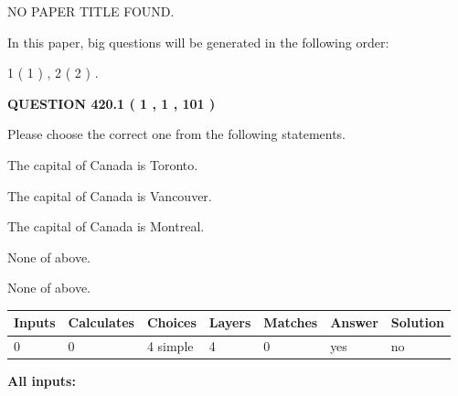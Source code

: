 \documentclass[12pt]{article}
\begin{document}
   
   
   
 NO PAPER TITLE FOUND.
   
   
   
\vspace{0.2in}
   
In this paper, big questions will be generated in the following order: 
   
   
   1 ( 1 )
 ,
   2 ( 2 )
 .
  
\vspace{0.2in}
  
{\textbf{\Large{QUESTION
420.1 
 ( 1 , 1 , 101 )
}}}
  
  
Please choose the correct one from the following statements.
 
 
The capital of Canada is Toronto.
 
 
The capital of Canada is Vancouver.
 
 
The capital of Canada is Montreal.
 
 
 None of above.
 
 
\noindent{}
 
 
 None of above.
 
 
\noindent{}
 
 
   
   
   
   
\noindent\begin{tabular}{|l|l|l|l|l|l|l|}
 \hline
Inputs & Calculates & Choices & Layers & Matches & Answer & Solution \\ \hline
 0  & 
 0  & 
 4
  simple  
  & 
 4  & 
 0  & 
  yes & 
  no 
  \\ \hline
 \end{tabular}
   
   
   
   
\noindent{}
   
   
   
   
\noindent\vspace{0.1in}\hspace{-0.08in} {\textbf{\Large{All inputs: }}}
   
   
  
\end{document}
